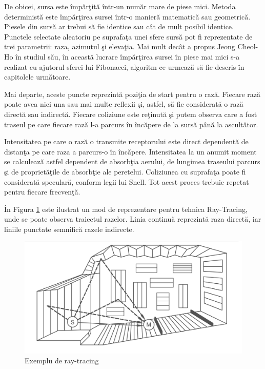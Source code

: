 	De obicei, sursa este \^{i}mp\u{a}r\c{t}it\u{a} \^{i}ntr-un num\u{a}r mare de piese mici. Metoda determinist\u{a} este \^{i}mp\u{a}r\c{t}irea sursei \^{i}ntr-o manier\u{a} matematic\u{a} sau geometric\u{a}. Piesele din surs\u{a} ar trebui s\u{a} fie identice sau c\^{a}t de mult posibil identice. Punctele selectate aleatoriu pe suprafa\c{t}a unei sfere surs\u{a} pot fi reprezentate de trei parametrii: raza, azimutul \c{s}i eleva\c{t}ia\cite{jeong}. Mai mult dec\^{a}t a propus Jeong Cheol-Ho \^{i}n studiul s\u{a}u, \^{i}n aceast\u{a} lucrare \^{i}mp\u{a}r\c{t}irea sursei \^{i}n piese mai mici s-a realizat cu ajutorul sferei lui Fibonacci, algoritm ce urmeaz\u{a} s\u{a} fie descris \^{i}n capitolele urm\u{a}toare.
	\bigskip
	
	Mai departe, aceste puncte reprezint\u{a} pozi\c{t}ia de start pentru o raz\u{a}. Fiecare raz\u{a} poate avea nici una sau mai multe reflexii \c{s}i, astfel, s\u{a} fie considerat\u{a} o raz\u{a} direct\u{a} sau indirect\u{a}. Fiecare coliziune este re\c{t}inut\u{a} \c{s}i putem observa care a fost traseul pe care fiecare raz\u{a} l-a parcurs \^{i}n \^{i}nc\u{a}pere de la surs\u{a} p\^{a}n\u{a} la ascult\u{a}tor.
	\bigskip
	
	Intensitatea pe care o raz\u{a} o transmite receptorului este direct dependent\u{a} de distan\c{t}a pe care raza a parcurs-o \^{i}n \^{i}nc\u{a}pere. Intensitatea la un anumit moment se calculeaz\u{a} astfel dependent de absorb\c{t}ia aerului, de lungimea traseului parcurs \c{s}i de propriet\u{a}\c{t}ile de absorb\c{t}ie ale peretelui. Coliziunea cu suprafa\c{t}a poate fi considerat\u{a} specular\u{a}, conform legii lui Snell.	Tot acest proces trebuie repetat pentru fiecare frecven\c{t}\u{a}.
	\bigskip
	
	\^{I}n Figura \ref{Fig9} este ilustrat un mod de reprezentare pentru tehnica Ray-Tracing, unde se poate observa traiectul razelor. Linia continu\u{a} reprezint\u{a} raza direct\u{a}, iar liniile punctate semnific\u{a} razele indirecte.
	
	\begin{figure}[!htb]
		\centering
		\includegraphics[width=12cm]{imagini/roomExample.png}
		\caption{Exemplu de ray-tracing}
		\label{Fig9}
	\end{figure}
	
